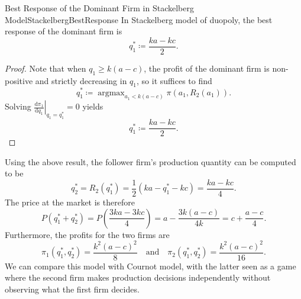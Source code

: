 \documentclass[math]{amznotes}
\theoremstyle{remark}
\renewcommand{\d}{\mathrm{d}}
\DeclareMathOperator*{\argmax}{argmax}
\begin{document}
\begin{probox}{Best Response of the Dominant Firm in Stackelberg Model}{StackelbergBestResponse}
    In Stackelberg model of duopoly, the best response of the dominant firm is
    \begin{equation*}
        q_1^* \coloneqq \frac{ka - kc}{2}.
    \end{equation*}
    \tcblower
    \begin{proof}
        Note that when $q_1 \geq k\left(a - c\right)$, the profit of the dominant firm is non-positive and strictly decreasing in $q_1$, so it suffices to find 
        \begin{equation*}
            q_1^* \coloneqq \argmax_{a_1 < k\left(a - c\right)} \pi\left(a_1, R_2\left(a_1\right)\right).
        \end{equation*}
        Solving $\left.\frac{\d\pi_1}{\d q_1}\right\rvert_{q_1 = q_1^*} = 0$ yields
        \begin{equation*}
            q_1^* \coloneqq \frac{ka - kc}{2}.
        \end{equation*}
    \end{proof}
\end{probox}
Using the above result, the follower firm's production quantity can be computed to be 
\begin{equation*}
    q_2^* = R_2\left(q_1^*\right) = \frac{1}{2}\left(ka - q_1^* - kc\right) = \frac{ka - kc}{4}.
\end{equation*}
The price at the market is therefore
\begin{equation*}
    P\left(q_1^* + q_2^*\right) = P\left(\frac{3ka - 3kc}{4}\right) = a - \frac{3k\left(a - c\right)}{4k} = c + \frac{a - c}{4}.
\end{equation*}
Furthermore, the profits for the two firms are 
\begin{equation*}
    \pi_1\left(q_1^*, q_2^*\right) = \frac{k^2\left(a - c\right)^2}{8} \quad\textrm{and}\quad \pi_2\left(q_1^*, q_2^*\right) = \frac{k^2\left(a - c\right)^2}{16}.
\end{equation*}
We can compare this model with Cournot model, with the latter seen as a game where the second firm makes production decisions independently without observing what the first firm decides.
\end{document}
